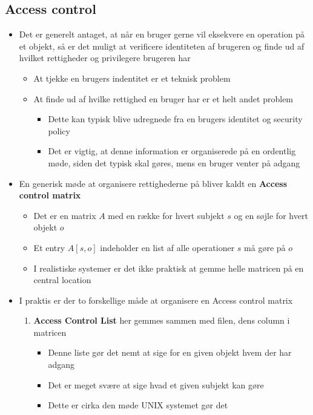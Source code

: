 \documentclass[a4, english]{article}
\begin{document}
\subsection{Access control}
\begin{itemize}
	\item Det er generelt antaget, at når en bruger gerne vil eksekvere en operation på et objekt, så er det muligt at verificere identiteten af brugeren og finde ud af hvilket rettigheder og privilegere brugeren har   
  \begin{itemize}
  	\item At tjekke en brugers indentitet er et teknisk problem  
    \item At finde ud af hvilke rettighed en bruger har er et helt andet problem  
    \begin{itemize}
    	\item Dette kan typisk blive udregnede fra en brugers identitet og security policy  
      \item Det er vigtig, at denne information er organiserede på en ordentlig møde, siden det typisk skal gøres, mens en bruger venter på adgang 
    \end{itemize}
  \end{itemize}
  \item En generisk møde at organisere rettighederne på bliver kaldt en \textbf{Access control matrix}
  \begin{itemize}
  	\item Det er en matrix $A$ med en række for hvert subjekt $s$ og en søjle for hvert objekt $o$ 
    \item Et entry $A[s,o]$ indeholder en list af alle operationer $s$ må gøre på $o$ 
    \item I realistiske systemer er det ikke praktisk at gemme helle matricen på en central location
  \end{itemize}
  \item I praktis er der to forskellige måde at organisere en Access control matrix     
  \begin{enumerate}
  	\item \textbf{Access Control List} her gemmes sammen med filen, dens column i matricen
    \begin{itemize}
    	\item Denne liste gør det nemt at sige for en given objekt hvem der har adgang 
      \item Det er meget svære at sige hvad et given subjekt kan gøre
      \item Dette er cirka den møde UNIX systemet gør det 

\end{itemize}
\end{enumerate}
\end{itemize}
\end{document}
